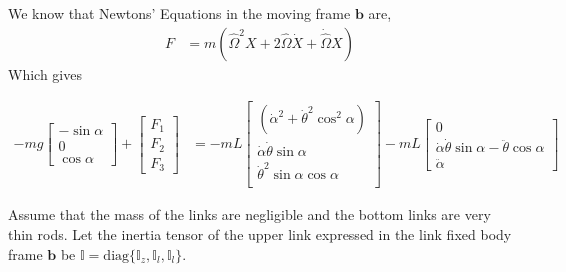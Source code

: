 \documentclass[graybox,envcountchap,sectrefs]{svmonoMuga}
\begin{document}
We know that Newtons' Equations in the moving frame $\mathbf{b}$ are,\\
\begin{align*}
F&=m(\widehat{\Omega}^2 X + 2\widehat{\Omega}\dot{X}+ \dot{\widehat{\Omega}}X)
\end{align*}
Which gives

\begin{align}
-mg\left[\begin{matrix}
  -\sin{\alpha} \\
  0\\
  \cos{\alpha}
 \end{matrix}\right]
+ \left[\begin{matrix}
  F_1 \\
  F_2\\
  F_3
 \end{matrix}\right]&=-mL\begin{bmatrix}(\dot{\alpha}^2+\dot{\theta}^2\cos^2\alpha)\\
 \dot{\alpha}\dot{\theta}\sin{\alpha}\\
 \dot{\theta}^2\sin\alpha\cos\alpha\\
 \end{bmatrix}
 -mL\begin{bmatrix} 0\\
 \dot{\alpha}\dot{\theta}\sin\alpha-\ddot{\theta}\cos\alpha\\ \ddot{\alpha}
 \end{bmatrix}\label{eq:Governor1}
\end{align}

Assume that the mass of the links are negligible and the bottom links are very thin rods. Let the inertia tensor of the upper link expressed in the link fixed body frame $\mathbf{b}$ be $\mathbb{I}=\mathrm{diag}\{\mathbb{I}_z,\mathbb{I}_l,\mathbb{I}_l\}$.
\end{document}

